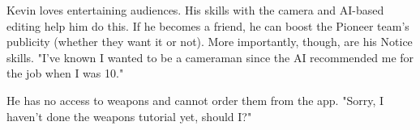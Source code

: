\begin{npcBox}[title=Kevin\, Camera]
    \begin{consequences}
    \item {}
    \item {}
    \item {}
    \end{consequences}

    \begin{npcDescription}
    Kevin loves entertaining audiences. His skills with the camera and AI-based editing help him do this. If he becomes a friend, he can boost the Pioneer team's publicity (whether they want it or not). More importantly, though, are his Notice skills.
    "I've known I wanted to be a cameraman since the AI recommended me for the job when I was 10."


    He has no access to weapons and cannot order them from the app. "Sorry, I haven't done the weapons tutorial yet, should I?"

    \end{npcDescription}

\end{npcBox}


